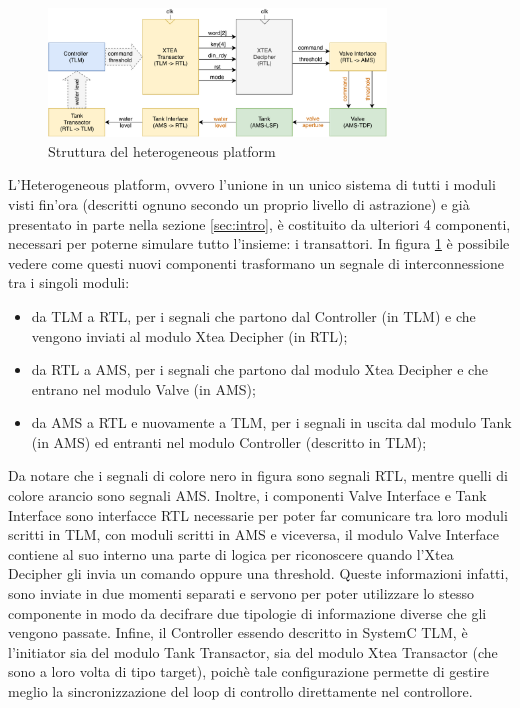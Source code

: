 \documentclass[]{IEEEtran}
\begin{document}
\begin{figure}[b]
    \centering
    \includegraphics[width=0.8\textwidth]{figures/heterogeneous.pdf}
    \caption{Struttura del heterogeneous platform}
    \label{fig:heterogeneous}
\end{figure}

L'Heterogeneous platform, ovvero l'unione in un unico sistema di tutti i moduli visti fin'ora (descritti ognuno secondo 
un proprio livello di astrazione) e gi\`a presentato in parte nella sezione \ref{sec:intro}, \`e costituito da ulteriori 
4 componenti, necessari per poterne simulare tutto l'insieme: i transattori. 
In figura \ref{fig:heterogeneous} \`e possibile vedere come questi nuovi componenti trasformano un segnale di 
interconnessione tra i singoli moduli:
\begin{itemize}
    \item da TLM a RTL, per i segnali che partono dal Controller (in TLM) e che vengono 
    inviati al modulo Xtea Decipher (in RTL);
    \item da RTL a AMS, per i segnali che partono dal modulo Xtea Decipher e che entrano nel 
    modulo Valve (in AMS);
    \item da AMS a RTL e nuovamente a TLM, per i segnali in uscita dal modulo Tank (in AMS) ed entranti nel modulo 
    Controller (descritto in TLM);
\end{itemize}
Da notare che i segnali di colore nero in figura sono segnali RTL, mentre quelli di colore arancio sono segnali AMS.
Inoltre, i componenti Valve Interface e Tank Interface sono interfacce RTL necessarie per poter 
far comunicare tra loro moduli scritti in TLM, con moduli scritti in AMS e viceversa, il modulo Valve Interface 
contiene al suo interno una parte di logica per riconoscere quando l'Xtea Decipher gli invia un comando oppure una 
threshold. Queste informazioni infatti, sono inviate in due momenti separati e servono per poter utilizzare lo stesso 
componente in modo da decifrare due tipologie di informazione diverse che gli vengono passate.
Infine, il Controller essendo descritto in SystemC TLM, \`e l'initiator sia del modulo Tank Transactor, sia del modulo 
Xtea Transactor (che sono a loro volta di tipo target), poich\`e tale configurazione permette di gestire meglio la 
sincronizzazione del loop di controllo direttamente nel controllore.
\end{document}
